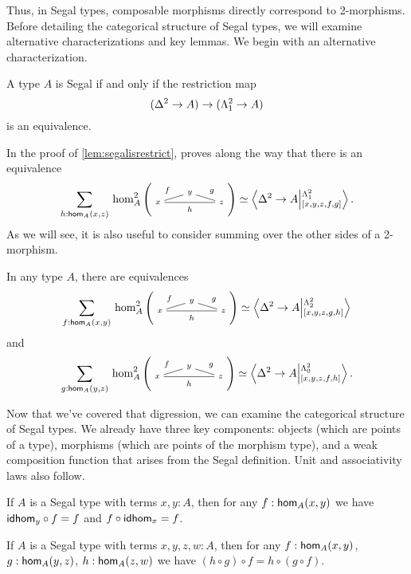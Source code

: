 \documentclass[main.tex]{subfiles}
\begin{document}
Thus, in Segal types, composable morphisms directly correspond to 2-mor{\linebreak}phisms. Before detailing the categorical structure of Segal types, we will examine alternative characterizations and key lemmas. We begin with an alternative characterization.

\begin{lemma}
    \label{lem:segalisrestrict}
    A type $A$ is Segal if and only if the restriction map
    $$
    (\tsx \to A) \to (\tohorn \to A) 
    $$
    is an equivalence. 
    \end{lemma}
    In the proof of \ref{lem:segalisrestrict}, \cite{riehl_type_2017} proves along the way that there is an equivalence
    \begin{equation}
        \sm{h : \ho[A]{x}{z}}\homtwo{A}(x,y,z,f,g,h) \simeq \ndexten{\tsx}{A}{\tohorn}{[x,y,z,f,g]}.
    \end{equation}
    As we will see, it is also useful to consider summing over the other sides of a 2-morphism.
    \begin{corollary}
        In any type $A$, there are equivalences
        \begin{equation}
            \label{rem:sumoverfistt}
        \sm{f : \ho[A]{x}{y}}\homtwo{A}(x,y,z,f,g,h) \simeq \ndexten{\tsx}{A}{\tthorn}{[x,y,z,g,h]}
        \end{equation}
        and
        \begin{equation}
        \sm{g : \ho[A]{y}{z}}\homtwo{A}(x,y,z,f,g,h) \simeq \ndexten{\tsx}{A}{\tzhorn}{[x,y,z,f,h]}.
        \end{equation}
    \end{corollary}

Now that we've covered that digression, we can examine the categorical structure of Segal types. We already have three key components: objects (which are points of a type), morphisms (which are points of the morphism type), and a weak composition function that arises from the Segal definition. Unit and associativity laws also follow.

\begin{lemma}
    If $A$ is a Segal type with terms $x,y : A$, then for any $f : \ho[A]{x}{y}$ we have $\idhom{y}\circ f = f$ and $f \circ \idhom{x} = f$.
\end{lemma}

\begin{lemma}
    If $A$ is a Segal type with terms $x,y,z,w : A$, then for any $f : \ho[A]{x}{y}$, $g : \ho[A]{y}{z}$, $h : \ho[A]{z}{w}$ we have $(h \circ g )  \circ f = h \circ (g \circ f).$
\end{lemma}
\end{document}
